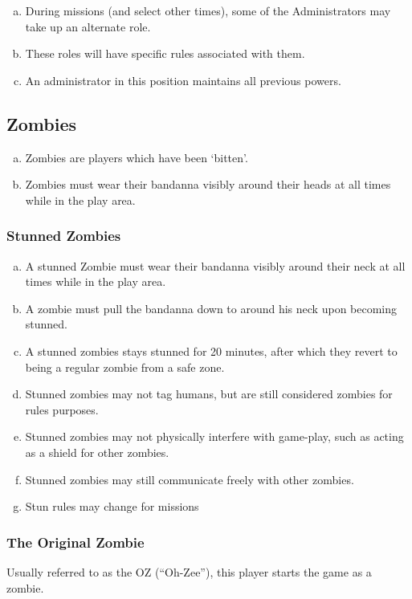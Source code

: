 \documentclass[a4paper,12pt]{article}
\begin{document}
\begin{enumerate}[(a)]
    \item During missions (and select other times), some of the Administrators may take up an alternate role.
    \item These roles will have specific rules associated with them.
    \item An administrator in this position maintains all previous powers.
    
    \end{enumerate}

\subsection{Zombies}

\begin{enumerate}[(a)]
    \item Zombies are players which have been `bitten'.
    \item Zombies must wear their bandanna visibly around their heads at all times while in the play area.
\end{enumerate}

\subsubsection{Stunned Zombies}
\label{StunnedZombies}
\begin{enumerate}[(a)]
    \item A stunned Zombie must wear their bandanna visibly around their neck at all times while in the play area.
    \item A zombie must pull the bandanna down to around his neck upon becoming stunned.
    \item A stunned zombies stays stunned for 20 minutes, after which they revert to being a regular zombie from a safe zone.
    \item Stunned zombies may not tag humans, but are still considered zombies for rules purposes.
    \item Stunned zombies may not physically interfere with game-play, such as acting as a shield for other zombies.
    \item Stunned zombies may still communicate freely with other zombies.
    \item Stun rules may change for missions
\end{enumerate}


\subsubsection{The Original Zombie}
Usually referred to as the OZ (``Oh-Zee''), this player starts the game as a zombie.
\end{document}
